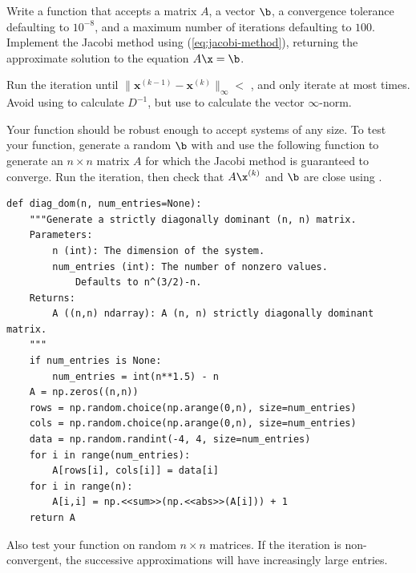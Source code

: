 \begin{problem} %
Write a function that accepts a matrix $A$, a vector $\b$, a convergence tolerance  defaulting to $10^{-8}$, and a maximum number of iterations  defaulting to $100$.
Implement the Jacobi method using (\ref{eq:jacobi-method}), returning the approximate solution to the equation $A\x = \b$.

Run the iteration until $\|\mathbf{x}^{(k-1)} - \mathbf{x}^{(k)}\|_{\infty} <$ , and only iterate at most  times.
Avoid using  to calculate $D^{-1}$, but use  to calculate the vector $\infty$-norm.

%

Your function should be robust enough to accept systems of any size.
To test your function, generate a random $\b$ with  and use the following function to generate an $n\times n$ matrix $A$ for which the Jacobi method is guaranteed to converge.
Run the iteration, then check that $A\x^{(k)}$ and $\b$ are close using .

\begin{lstlisting}
def diag_dom(n, num_entries=None):
    """Generate a strictly diagonally dominant (n, n) matrix.
    Parameters:
        n (int): The dimension of the system.
        num_entries (int): The number of nonzero values.
            Defaults to n^(3/2)-n.
    Returns:
        A ((n,n) ndarray): A (n, n) strictly diagonally dominant matrix.
    """
    if num_entries is None:
        num_entries = int(n**1.5) - n
    A = np.zeros((n,n))
    rows = np.random.choice(np.arange(0,n), size=num_entries)
    cols = np.random.choice(np.arange(0,n), size=num_entries)
    data = np.random.randint(-4, 4, size=num_entries)
    for i in range(num_entries):
        A[rows[i], cols[i]] = data[i]
    for i in range(n):
        A[i,i] = np.<<sum>>(np.<<abs>>(A[i])) + 1
    return A
\end{lstlisting}

Also test your function on random $n \times n$ matrices.
If the iteration is non-convergent, the successive approximations will have increasingly large entries.

\label{prob:jacobi}
\end{problem}

